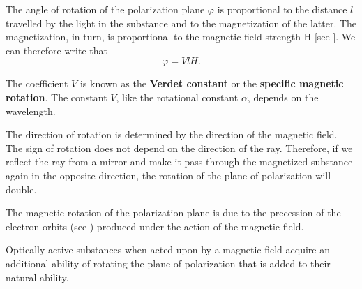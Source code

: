 The angle of rotation of the polarization plane $\varphi$ is proportional to the distance $l$ travelled by the light in the substance and to the
magnetization of the latter.
The magnetization, in turn, is proportional to the magnetic field strength H [see ].
We can therefore write that
\begin{equation}\label{eq:19_24}
	\varphi = V l H.
\end{equation}

\noindent
The coefficient $V$ is known as the \textbf{Verdet constant} or the \textbf{specific magnetic
rotation}.
The constant $V$, like the rotational constant $\alpha$, depends on the wavelength.

The direction of rotation is determined by the direction of the magnetic field.
The sign of rotation does not depend on the direction of the ray.
Therefore, if we reflect the ray from a mirror and make it pass through the magnetized substance again in the opposite direction, the rotation of the plane of polarization will double.

The magnetic rotation of the polarization plane is due to the precession of the electron orbits (see ) produced under the action of the magnetic field.

Optically active substances when acted upon by a magnetic field acquire an additional ability of rotating the plane of polarization that is added to their natural ability.
